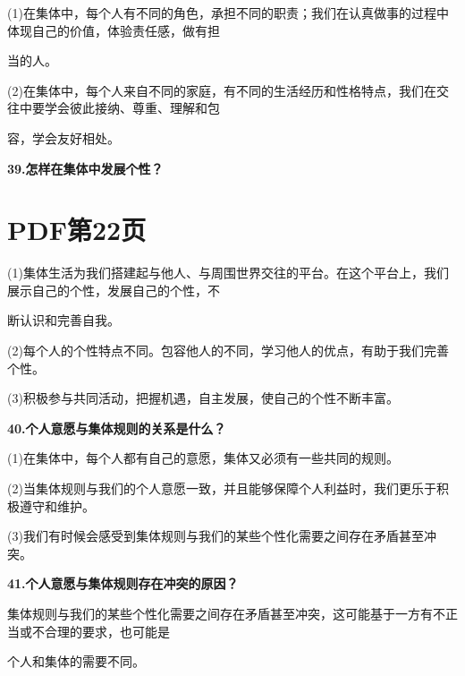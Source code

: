 \documentclass[lang=cn,11pt]{elegantbook}
\begin{document}
(1)在集体中，每个人有不同的角色，承担不同的职责；我们在认真做事的过程中体现自己的价值，体验责任感，做有担\par

当的人。\par

(2)在集体中，每个人来自不同的家庭，有不同的生活经历和性格特点，我们在交往中要学会彼此接纳、尊重、理解和包\par

容，学会友好相处。\par

\textbf{39.怎样在集体中发展个性？}\par


\section*{PDF第22页}

(1)集体生活为我们搭建起与他人、与周围世界交往的平台。在这个平台上，我们展示自己的个性，发展自己的个性，不\par

断认识和完善自我。\par

(2)每个人的个性特点不同。包容他人的不同，学习他人的优点，有助于我们完善个性。\par

(3)积极参与共同活动，把握机遇，自主发展，使自己的个性不断丰富。\par

\textbf{40.个人意愿与集体规则的关系是什么？}\par

(1)在集体中，每个人都有自己的意愿，集体又必须有一些共同的规则。\par

(2)当集体规则与我们的个人意愿一致，并且能够保障个人利益时，我们更乐于积极遵守和维护。\par

(3)我们有时候会感受到集体规则与我们的某些个性化需要之间存在矛盾甚至冲突。\par

\textbf{41.个人意愿与集体规则存在冲突的原因？}\par

集体规则与我们的某些个性化需要之间存在矛盾甚至冲突，这可能基于一方有不正当或不合理的要求，也可能是\par

个人和集体的需要不同。\par
\end{document}
